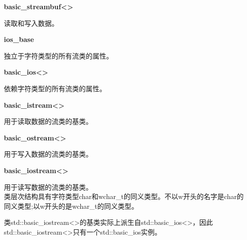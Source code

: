 


\noindent
\textbf{basic\_streambuf<>}

读取和写入数据。

\noindent
\textbf{ios\_base}

独立于字符类型的所有流类的属性。

\noindent
\textbf{basic\_ios<>}

依赖字符类型的所有流类的属性。

\noindent
\textbf{basic\_istream<>}

用于读取数据的流类的基类。

\noindent
\textbf{basic\_ostream<>}

用于写入数据的流类的基类。

\noindent
\textbf{basic\_iostream<>}

用于读写数据的流类的基类。\\

类层次结构具有字符类型char和wchar\_t的同义类型。不以w开头的名字是char的同义类型;以w开头的是wchar\_t的同义类型。

类std::basic\_iostream<>的基类实际上派生自std::basic\_ios<>，因此std::basic\_iostream<>只有一个std::basic\_ios实例。






























